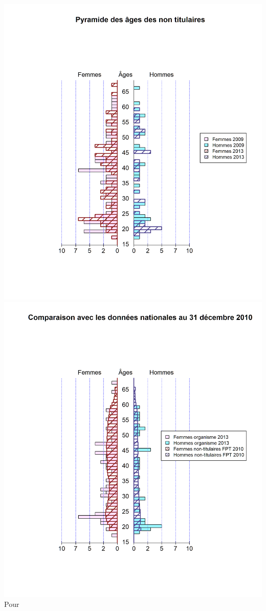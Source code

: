 \includegraphics{altair_files/figure-latex/unnamed-chunk-23-1.png}
\includegraphics{altair_files/figure-latex/unnamed-chunk-23-2.png} Pour
